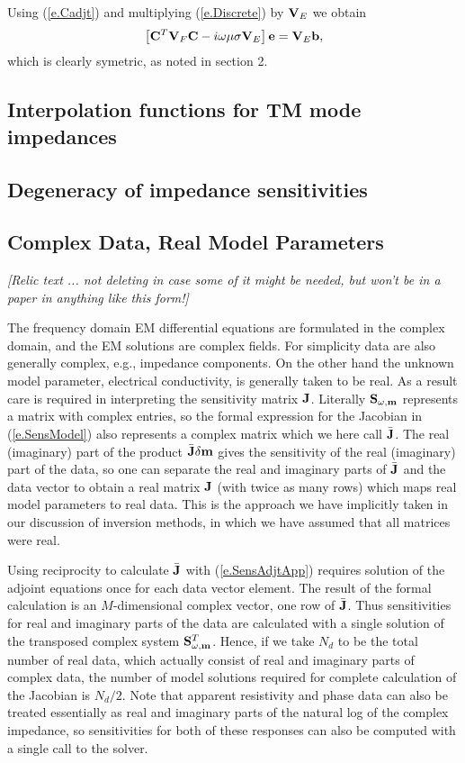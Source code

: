 Using (\ref{e.Cadjt})  and multiplying (\ref{e.Discrete}) by
${\bf V}_E$ we obtain
\begin{equation}
\label{e.Symmetric}
\left[
{\bf C}^T{\bf V}_F{\bf C} - i \omega\mu\sigma{\bf V}_E
\right] {\bf e} = {\bf V}_E{\bf b} ,
\end{equation}
which is clearly symetric, as noted in section 2.

\subsection{Interpolation functions for TM mode impedances}

\subsection{Degeneracy of impedance sensitivities}

\subsection{Complex Data, Real Model Parameters}

{\em [Relic text ... not deleting in case some of it might
be needed, but won't be in a paper in anything like this form!]}

The frequency domain EM differential equations
are formulated in the complex domain,
and the EM solutions are complex fields.  For simplicity
data are also generally complex, e.g., impedance components.
On the other hand the unknown model parameter,
electrical conductivity, is generally taken to be real.
As a result care is required in
interpreting the sensitivity matrix ${\bf J}$.  Literally
${\bf S}_{\omega, {\bf m}}$ represents a matrix with complex entries,
so the formal expression for the Jacobian in (\ref{e.SensModel})
also represents a complex matrix which we here
call $\bar {{\bf J}}$.  The real (imaginary) part of the product
$\bar {{\bf J}}  \delta {\bf m}$ gives the sensitivity of the real (imaginary) part of
the data, so one can separate the real and imaginary parts of $\bar {{\bf J}}$ and
the data vector to obtain a real matrix
${\bf J}$ (with twice as many rows) which maps
real model parameters to real data.  This is the approach we
have implicitly taken in our discussion of inversion methods, in which
we have assumed that all matrices were real.

Using reciprocity to calculate $\bar {{\bf J}}$ with (\ref{e.SensAdjtApp})
requires solution of the adjoint equations once for each data vector
element.
The result of the formal calculation is an $M$-dimensional complex
vector, one row of $\bar {{\bf J}}$.
Thus sensitivities for real and imaginary
parts of the data are calculated with a single solution of the
transposed complex system ${\bf S}_{\omega, {\bf m}}^T$.  Hence, if
we take $N_d$ to be the total number of real data, which actually
consist of real and imaginary parts of complex data, the number
of model solutions required for complete calculation of the Jacobian
is $N_d/2$.  Note that apparent resistivity and phase data can also
be treated essentially as real and imaginary parts of the natural
log of the complex impedance, so sensitivities for both of these
responses can also be computed with a single call to the solver.

